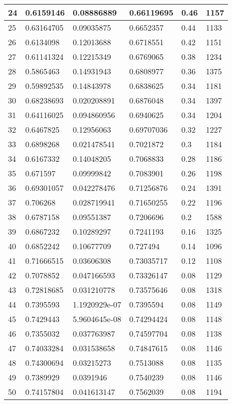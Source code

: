 \begin{longtable}{|l|l|l|l|l|l|}
24 & 0.6159146 & 0.08886889 & 0.66119695 & 0.46 & 1157 \\ \hline 
25 & 0.63164705 & 0.09035875 & 0.6652357 & 0.44 & 1133 \\ \hline 
26 & 0.6134098 & 0.12013688 & 0.6718551 & 0.42 & 1151 \\ \hline 
27 & 0.61141324 & 0.12215349 & 0.6769065 & 0.38 & 1234 \\ \hline 
28 & 0.5865463 & 0.14931943 & 0.6808977 & 0.36 & 1375 \\ \hline 
29 & 0.59892535 & 0.14843978 & 0.6838625 & 0.34 & 1181 \\ \hline 
30 & 0.68238693 & 0.020208891 & 0.6876048 & 0.34 & 1397 \\ \hline 
31 & 0.64116025 & 0.094860956 & 0.6940625 & 0.34 & 1204 \\ \hline 
32 & 0.6467825 & 0.12956063 & 0.69707036 & 0.32 & 1227 \\ \hline 
33 & 0.6898268 & 0.021478541 & 0.7021872 & 0.3 & 1184 \\ \hline 
34 & 0.6167332 & 0.14048205 & 0.7068833 & 0.28 & 1186 \\ \hline 
35 & 0.671597 & 0.09999842 & 0.7083901 & 0.26 & 1198 \\ \hline 
36 & 0.69301057 & 0.042278476 & 0.71256876 & 0.24 & 1391 \\ \hline 
37 & 0.706268 & 0.028719941 & 0.71650255 & 0.22 & 1196 \\ \hline 
38 & 0.6787158 & 0.09551387 & 0.7206696 & 0.2 & 1588 \\ \hline 
39 & 0.6867232 & 0.10289297 & 0.7241193 & 0.16 & 1325 \\ \hline 
40 & 0.6852242 & 0.10677709 & 0.727494 & 0.14 & 1096 \\ \hline 
41 & 0.71666515 & 0.03606308 & 0.73035717 & 0.12 & 1108 \\ \hline 
42 & 0.7078852 & 0.047166593 & 0.73326147 & 0.08 & 1129 \\ \hline 
43 & 0.72818685 & 0.031210778 & 0.73575646 & 0.08 & 1318 \\ \hline 
44 & 0.7395593 & 1.1920929e-07 & 0.7395594 & 0.08 & 1149 \\ \hline 
45 & 0.7429443 & 5.9604645e-08 & 0.74294424 & 0.08 & 1148 \\ \hline 
46 & 0.7355032 & 0.037763987 & 0.74597704 & 0.08 & 1138 \\ \hline 
47 & 0.74033284 & 0.031538658 & 0.74847615 & 0.08 & 1146 \\ \hline 
48 & 0.74300694 & 0.03215273 & 0.7513088 & 0.08 & 1135 \\ \hline 
49 & 0.7389929 & 0.0391946 & 0.7540239 & 0.08 & 1146 \\ \hline 
50 & 0.74157804 & 0.041613147 & 0.7562039 & 0.08 & 1194 \\ \hline 
\end{longtable}